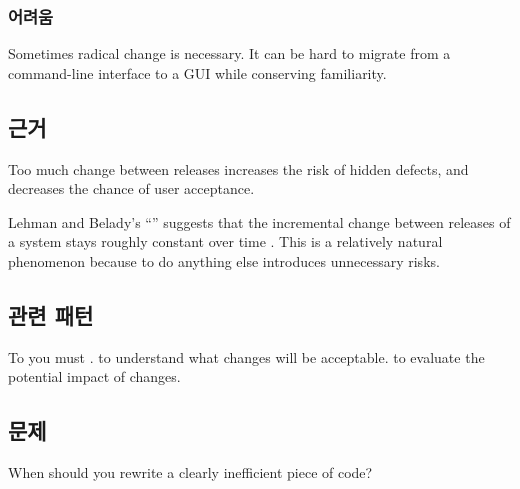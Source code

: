 \documentclass[a4paper,10pt,twoside]{book}
\begin{document}
\subsubsection*{어려움}

\begin{bulletlist}
\item Sometimes radical change is necessary. It can be hard to migrate from a command-line interface to a GUI while conserving familiarity.
\end{bulletlist}

\subsection*{근거}

Too much change between releases increases the risk of hidden defects, and decreases the chance of user acceptance. 

Lehman and Belady's ``'' suggests that the incremental change between releases of a system stays roughly constant over time \cite{Lehm85a}. This is a relatively natural phenomenon because to do anything else introduces unnecessary risks.

\subsection*{관련 패턴}

To  you must .  to understand what changes will be acceptable.  to evaluate the potential impact of changes.




\subsection*{문제}

When should you rewrite a clearly inefficient piece of code?
\end{document}
